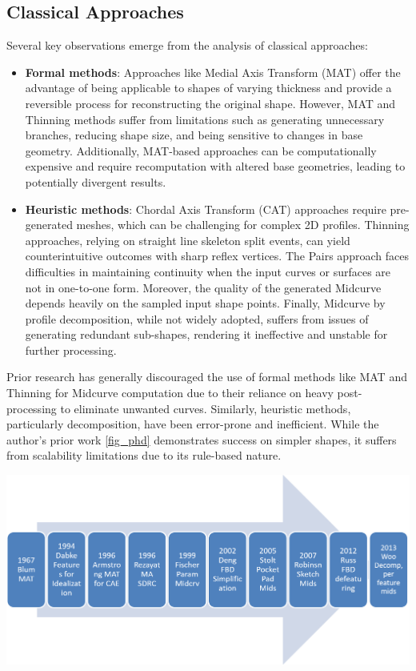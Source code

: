 \documentclass[conference]{IEEEtran}
\begin{document}
\subsection{Classical Approaches}
\label{subsec:1}
Several key observations emerge from the analysis of classical approaches:
\begin{itemize}
\item {\bf Formal methods}: Approaches like Medial Axis Transform (MAT) offer the advantage of being applicable to shapes of varying thickness and provide a reversible process for reconstructing the original shape. However, MAT and Thinning methods suffer from limitations such as generating unnecessary branches, reducing shape size, and being sensitive to changes in base geometry. Additionally, MAT-based approaches can be computationally expensive and require recomputation with altered base geometries, leading to potentially divergent results.
\item {\bf Heuristic methods}: Chordal Axis Transform (CAT) approaches require pre-generated meshes, which can be challenging for complex 2D profiles. Thinning approaches, relying on straight line skeleton split events, can yield counterintuitive outcomes with sharp reflex vertices. The Pairs approach faces difficulties in maintaining continuity when the input curves or surfaces are not in one-to-one form. Moreover, the quality of the generated Midcurve depends heavily on the sampled input shape points. Finally, Midcurve by profile decomposition, while not widely adopted, suffers from issues of generating redundant sub-shapes, rendering it ineffective and unstable for further processing.
\end{itemize}

Prior research has generally discouraged the use of formal methods like MAT and Thinning for Midcurve computation due to their reliance on heavy post-processing to eliminate unwanted curves. Similarly, heuristic methods, particularly decomposition, have been error-prone and inefficient. While the author's prior work \ref{fig_phd}  demonstrates success on simpler shapes, it suffers from scalability limitations due to its rule-based nature.

     \begin{center}
	\includegraphics[width=0.8\linewidth]{images/midcurve15}
	 \cite{kulkarni2017}
	\label{fig_phd}
    \end{center}
\end{document}
